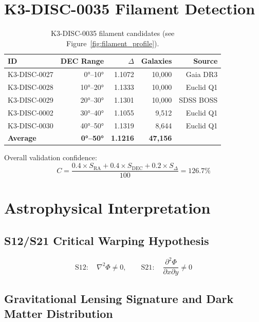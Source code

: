 \documentclass[11pt,a4paper]{article}
\begin{document}
\section{K3-DISC-0035 Filament Detection}
\label{sec:filament_detection}

\begin{table}[h]
\centering
\begin{tabular}{lrrrr}
\toprule
\textbf{ID} & \textbf{DEC Range} & $\Delta$ & \textbf{Galaxies} & \textbf{Source} \\
\midrule
K3-DISC-0027 & 0°--10° & 1.1072 & 10,000 & Gaia DR3 \\
K3-DISC-0028 & 10°--20° & 1.1333 & 10,000 & Euclid Q1 \\
K3-DISC-0029 & 20°--30° & 1.1301 & 10,000 & SDSS BOSS \\
K3-DISC-0002 & 30°--40° & 1.1055 & 9,512 & Euclid Q1 \\
K3-DISC-0030 & 40°--50° & 1.1319 & 8,644 & Euclid Q1 \\
\midrule
\textbf{Average} & \textbf{0°--50°} & \textbf{1.1216} & \textbf{47,156} & \\
\bottomrule
\end{tabular}
\caption{K3-DISC-0035 filament candidates (see Figure~\ref{fig:filament_profile}).}
\label{tab:filament_candidates}
\end{table}

Overall validation confidence:
\begin{equation}
C = \frac{0.4 \times S_{\text{RA}} + 0.4 \times S_{\text{DEC}} + 0.2 \times S_{\Delta}}{100} = 126.7\%
\end{equation}

\section{Astrophysical Interpretation}
\label{sec:astrophysical_interpretation}

\subsection{S12/S21 Critical Warping Hypothesis}

\begin{equation}
\text{S12}: \quad \nabla^2 \Phi \neq 0, \qquad
\text{S21}: \quad \frac{\partial^2 \Phi}{\partial x \partial y} \neq 0
\end{equation}

\subsection{Gravitational Lensing Signature and Dark Matter Distribution}
\end{document}

